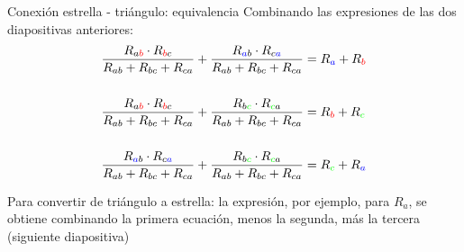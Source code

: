 \documentclass[aspectratio=169, xcolor={usenames,svgnames,dvipsnames}]{beamer}
\begin{document}

\begin{frame}{Conexión estrella - triángulo: \hspace{3mm}equivalencia}
Combinando las expresiones de las dos diapositivas anteriores:
    \begin{align*}
        \frac{R_{a{\color{red}b}} \cdot R_{{\color{red}b}c}}{R_{ab} + R_{bc} + R_{ca}} + \frac{R_{{\color{blue}a}b} \cdot R_{c{\color{blue}a}}}{R_{ab} + R_{bc} + R_{ca}} &= R_{\color{blue}a} + R_{\color{red}b}\\
        \\
        \frac{R_{a{\color{red}b}} \cdot R_{{\color{red}b}c}}{R_{ab} + R_{bc} + R_{ca}} + \frac{R_{b{\color{green}c}} \cdot R_{{\color{green}c}a}}{R_{ab} + R_{bc} + R_{ca}} &= R_{\color{red}b} + R_{\color{green}c}\\
        \\
        \frac{R_{{\color{blue}a}b} \cdot R_{c{\color{blue}a}}}{R_{ab} + R_{bc} + R_{ca}} + \frac{R_{b{\color{green}c}} \cdot R_{{\color{green}c}a}}{R_{ab} + R_{bc} + R_{ca}} &= R_{\color{green}c} + R_{\color{blue}a}
    \end{align*}
    
    Para \alert{convertir de triángulo a estrella}: la expresión, por ejemplo, para $R_a$, se obtiene combinando la primera ecuación, menos la segunda, más la tercera (siguiente diapositiva)
\end{frame}

\end{document}

